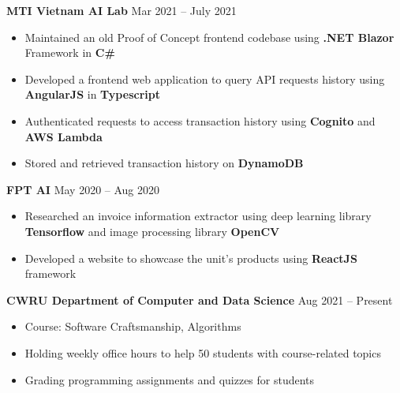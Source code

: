 \documentclass[11pt]{article}
\begin{document}
\hspace{10pt}\textbf{MTI Vietnam AI Lab} \hfill {\small Mar 2021 -- July 2021} \\
  \vspace{-2pt}
  \begin{itemize}[leftmargin=31pt]
  \vspace{-10pt}
    \setlength\itemsep{-5pt}
      \item {\small Maintained an old Proof of Concept frontend codebase using \textbf{.NET Blazor} Framework in \textbf{C\#}}
      \item {\small Developed a frontend web application to query API requests history using \textbf{AngularJS} in \textbf{Typescript}}
      \item {\small Authenticated requests to access transaction history using \textbf{Cognito} and \textbf{AWS Lambda}}
      \item {\small Stored and retrieved transaction history on \textbf{DynamoDB}}
    \vspace{-7pt}
  \end{itemize}

\hspace{10pt}\textbf{FPT AI} \hfill {\small May 2020 -- Aug 2020} \\
  \vspace{-2pt}
  \begin{itemize}[leftmargin=31pt]
  \vspace{-10pt}
    \setlength\itemsep{-5pt}
      \item {\small Researched an invoice information extractor using deep learning library \textbf{Tensorflow} and image processing library \textbf{OpenCV}}
      \item {\small Developed a website to showcase the unit’s products using \textbf{ReactJS} framework}
    \vspace{-7pt}
  \end{itemize}
  
  \hspace{10pt}\textbf{CWRU Department of Computer and Data Science} \hfill {\small Aug 2021 -- Present} \\
  \vspace{-2pt}
  \begin{itemize}[leftmargin=31pt]
  \vspace{-10pt}
    \setlength\itemsep{-5pt}
      \item {\small Course: Software Craftsmanship, Algorithms}
      \item {\small Holding weekly office hours to help 50 students with course-related topics}
      \item {\small Grading programming assignments and quizzes for students}
      \vspace{-7pt}
  \end{itemize}
\end{document}
